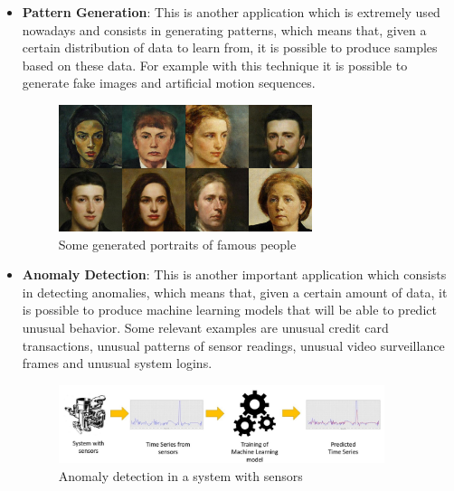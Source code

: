 \begin{itemize}
          \newpage
    \item \textbf{Pattern Generation}: This is another application which
          is extremely used nowadays and consists in generating patterns,
          which means that, given a certain distribution of data to learn
          from, it is possible to produce samples based on these data.
          For example with this technique it is possible to generate
          fake images and artificial motion sequences.
          \vspace{10mm}

          \begin{figure}[h]
              \centering
              \includegraphics[width=0.7\textwidth]{../img/Fake_img}
              \caption{Some generated portraits of famous people}
          \end{figure}

          \vspace{10mm}
    \item \textbf{Anomaly Detection}: This is another important
          application which consists in detecting anomalies, which means
          that, given a certain amount of data, it is possible to
          produce machine learning models that will be able to predict
          unusual behavior. Some relevant examples are unusual credit
          card transactions, unusual patterns of sensor readings,
          unusual video surveillance frames and unusual system logins.
          \vspace{10mm}

          \begin{figure}[h]
              \centering
              \includegraphics[width=0.9\textwidth]{../img/Anomaly_detect}
              \caption{Anomaly detection in a system with sensors}
          \end{figure}


\end{itemize}
